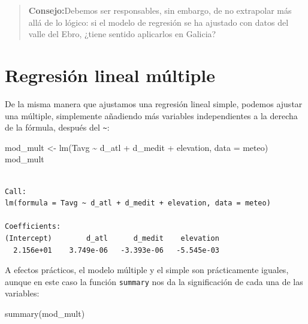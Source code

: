 \documentclass[
  letterpaper,
  DIV=11,
  numbers=noendperiod]{scrreprt}
\newenvironment{Shaded}{\begin{snugshade}}{\end{snugshade}}
\newcommand{\AttributeTok}[1]{\textcolor[rgb]{0.40,0.45,0.13}{#1}}
\newcommand{\FunctionTok}[1]{\textcolor[rgb]{0.28,0.35,0.67}{#1}}
\newcommand{\NormalTok}[1]{\textcolor[rgb]{0.00,0.23,0.31}{#1}}
\newcommand{\OtherTok}[1]{\textcolor[rgb]{0.00,0.23,0.31}{#1}}
\newcommand{\SpecialCharTok}[1]{\textcolor[rgb]{0.37,0.37,0.37}{#1}}
\begin{document}
\begin{quote}
\textbf{Consejo:}Debemos ser responsables, sin embargo, de no extrapolar
más allá de lo lógico: si el modelo de regresión se ha ajustado con
datos del valle del Ebro, ¿tiene sentido aplicarlos en Galicia?
\end{quote}

\hypertarget{regresiuxf3n-lineal-muxfaltiple}{%
\section{Regresión lineal
múltiple}\label{regresiuxf3n-lineal-muxfaltiple}}

De la misma manera que ajustamos una regresión lineal simple, podemos
ajustar una múltiple, simplemente añadiendo más variables independientes
a la derecha de la fórmula, después del \texttt{\textasciitilde{}}:

\begin{Shaded}
\begin{Highlighting}[]
\NormalTok{mod\_mult }\OtherTok{\textless{}{-}} \FunctionTok{lm}\NormalTok{(Tavg }\SpecialCharTok{\textasciitilde{}}\NormalTok{ d\_atl }\SpecialCharTok{+}\NormalTok{ d\_medit }\SpecialCharTok{+}\NormalTok{ elevation, }\AttributeTok{data =}\NormalTok{ meteo)}
\NormalTok{mod\_mult}
\end{Highlighting}
\end{Shaded}

\begin{verbatim}

Call:
lm(formula = Tavg ~ d_atl + d_medit + elevation, data = meteo)

Coefficients:
(Intercept)        d_atl      d_medit    elevation  
  2.156e+01    3.749e-06   -3.393e-06   -5.545e-03  
\end{verbatim}

A efectos prácticos, el modelo múltiple y el simple son prácticamente
iguales, aunque en este caso la función \texttt{summary} nos da la
significación de cada una de las variables:

\begin{Shaded}
\begin{Highlighting}[]
\FunctionTok{summary}\NormalTok{(mod\_mult)}
\end{Highlighting}
\end{Shaded}
\end{document}
